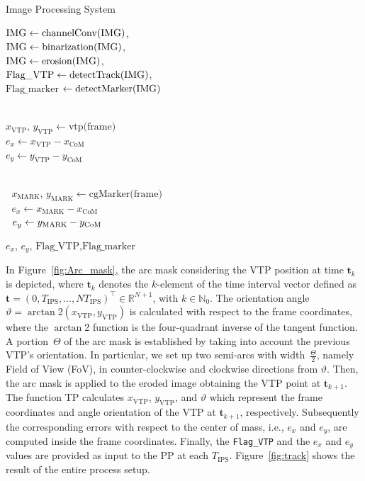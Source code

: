 \documentclass[a4paper,twocolumn,10pt]{article}
\begin{document}
    \begin{algorithm}
    \caption{Image Processing System}
    \label{alg:imageProcessing}
        $\text{IMG}  \gets \text{channelConv(\text{IMG})}$, \\
        $\text{IMG} \gets \text{binarization(\text{IMG})}$, \\
        $\text{IMG} \gets \text{erosion(\text{IMG})}$, \\
        $\text{Flag\_VTP} \gets \text{detectTrack(\text{IMG})}$, \\
        $\text{Flag\_marker}$ $\gets \text{detectMarker(\text{IMG})}$
        
         \\ 
        \quad $x_\mathrm{VTP} \text{, } y_\mathrm{VTP} \gets \text{vtp(frame)}$ \\
        \quad $e_x \gets x_\mathrm{VTP} - x_\mathrm{CoM}$ \\
        \quad $e_y \gets y_\mathrm{VTP} - y_\mathrm{CoM}$
        \EndIf

         \\
            \quad \quad $\;$ $x_\mathrm{MARK}$, $y_\mathrm{MARK} \gets \text{cgMarker(frame)}$ \\
            \quad \quad $\;$ $e_x \gets x_\mathrm{MARK} - x_\mathrm{CoM}$ \\ 
            \quad \quad $\;$ $e_y \gets y_{\rm MARK} - y_{\rm CoM}$
        \EndIf

        \Return $e_x$, $e_y$, $\text{Flag\_VTP}, \text{Flag\_marker}$ 
    \end{algorithm}

    In Figure~\ref{fig:Arc_mask}, the arc mask considering the VTP position at time $\mathbf{t}_k$ 
    is depicted, where $\mathbf{t}_k$ denotes the $k$-element of the time interval vector defined as 
    $\mathbf{t} =(0, T_\mathrm{IPS}, \dots, NT_\mathrm{IPS})^\top \in \mathbb{R}^{N+1}$, with $k \in 
    \mathbb{N}_0$. The orientation angle \mbox{$\vartheta = \arctan$2$(x_\mathrm{VTP},y_\mathrm{VTP})$} 
    is calculated with respect to the frame coordinates, where the $\arctan$2 function is the 
    four-quadrant inverse of the tangent function. A portion~$\varTheta$ of the arc mask is established 
    by taking into account the previous VTP's orientation. In particular, we set up two semi-arcs 
    with width~$\frac{\varTheta}{2}$, namely Field of View (FoV), in counter-clockwise and clockwise 
    directions from $\vartheta$. Then, the arc mask is applied to the eroded image obtaining 
    the VTP point at $\mathbf{t}_{k+1}$. The function TP calculates $x_\mathrm{VTP}$, 
    $y_\mathrm{VTP}$, and $\vartheta$ which represent the frame coordinates and angle orientation of 
    the VTP at  $\mathbf{t}_{k+1}$, respectively. Subsequently the corresponding errors with 
    respect to the center of mass, i.e., $e_x$ and $e_y$, are computed inside the frame coordinates. 
    Finally, the \texttt{Flag\_VTP} and the $e_x$ and $e_y$ values are provided as input to the PP 
    at each $T_\mathrm{IPS}$. Figure~\ref{fig:track} shows the result of the entire process setup. 
\end{document}
